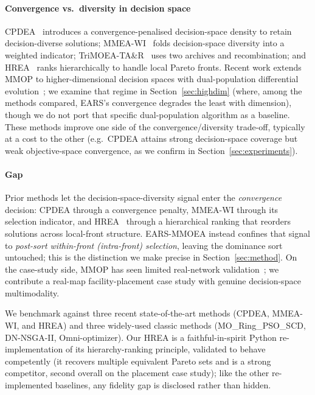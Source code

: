 \paragraph{Convergence vs.\ diversity in decision space} CPDEA~\parencite{liu2020cpdea}
introduces a convergence-penalised decision-space density to retain decision-diverse
solutions; MMEA-WI~\parencite{li2021mmeawi} folds decision-space diversity into a weighted
indicator; TriMOEA-TA\&R~\parencite{liu2019trimoea} uses two archives and recombination; and
HREA~\parencite{li2023hrea} ranks hierarchically to handle local Pareto fronts. Recent work
extends MMOP to higher-dimensional decision spaces with dual-population differential
evolution~\parencite{liang2024higherdim}; we examine that regime in Section~\ref{sec:highdim} (where, among the methods compared, EARS's
convergence degrades the least with dimension), though we do not
port that specific dual-population algorithm as a baseline. These methods improve one side of the convergence/diversity
trade-off, typically at a cost to the other (e.g.\ CPDEA attains strong decision-space coverage
but weak objective-space convergence, as we confirm in Section~\ref{sec:experiments}).

\paragraph{Gap} Prior methods let the decision-space-diversity signal enter the
\emph{convergence} decision: CPDEA through a convergence penalty, MMEA-WI through its
selection indicator, and HREA~\parencite{li2023hrea} through a hierarchical ranking that reorders
solutions across local-front structure. EARS-MMOEA instead confines that signal to
\emph{post-sort within-front (intra-front) selection}, leaving the dominance sort untouched; this is the
distinction we make precise in Section~\ref{sec:method}. On the case-study side, MMOP has
seen limited real-network validation~\parencite{tanabe2020review}; we contribute a real-map
facility-placement case study with genuine decision-space multimodality.

We benchmark against three recent state-of-the-art methods (CPDEA, MMEA-WI, and HREA) and three widely-used
classic methods (MO\_Ring\_PSO\_SCD, DN-NSGA-II, Omni-optimizer). Our HREA is a
faithful-in-spirit Python re-implementation of its hierarchy-ranking principle, validated to
behave competently (it recovers multiple equivalent Pareto sets and is a strong competitor,
second overall on the placement case study); like the other re-implemented baselines, any
fidelity gap is disclosed rather than hidden.
